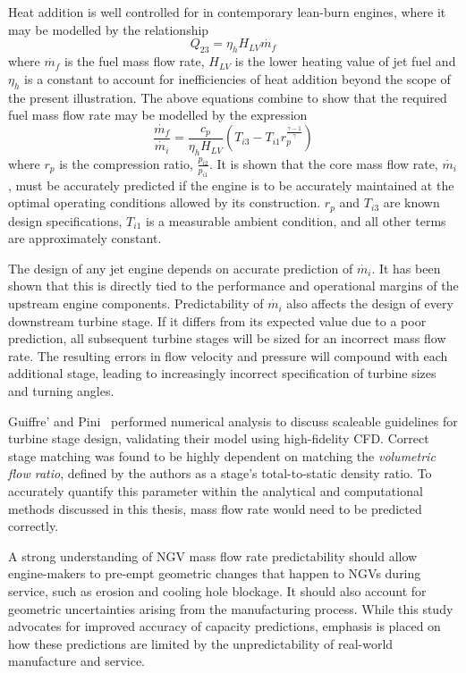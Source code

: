 \documentclass[a4paper, 11pt, oneside]{report}
\begin{document}
Heat addition is well controlled for in contemporary lean-burn engines, where it may be modelled by the relationship
\begin{equation}
	Q_{23} = 
	\eta_h
	H_{LV}
	\dot{m_f}
\end{equation}
where $\dot{m_f}$ is the fuel mass flow rate, $H_{LV}$ is the lower heating value of jet fuel and $\eta_h$ is a constant to account for inefficiencies of heat addition beyond the scope of the present illustration. The above equations combine to show that the required fuel mass flow rate may be modelled by the expression
\begin{equation}
	\frac{\dot{m_f}}{\dot{m_i}}
	=
	\frac{c_p}{\eta_{h}H_{LV}}
	\left(
		T_{i3} - 
		T_{i1}
		r_p
		^
		\frac{\gamma-1}{\gamma}
	\right)
\end{equation}
where $r_p$ is the compression ratio, $\frac{p_{i2}}{p_{i1}}$. It is shown that the core mass flow rate, $\dot{m_i}$, must be accurately predicted if the engine is to be accurately maintained at the optimal operating conditions allowed by its construction. $r_p$ and $T_{i3}$ are known design specifications, $T_{i1}$ is a measurable ambient condition, and all other terms are approximately constant. 

The design of any jet engine depends on accurate prediction of $\dot{m_i}$. It has been shown that this is directly tied to the performance and operational margins of the upstream engine components. Predictability of $\dot{m_i}$ also affects the design of every downstream turbine stage. If it differs from its expected value due to a poor prediction, all subsequent turbine stages will be sized for an incorrect mass flow rate. The resulting errors in flow velocity and pressure will compound with each additional stage, leading to increasingly incorrect specification of turbine sizes and turning angles.

Guiffre' and Pini~\cite{guiffre_design_guidelines} performed numerical analysis to discuss scaleable guidelines for turbine stage design, validating their model using high-fidelity CFD.  Correct stage matching was found to be highly dependent on matching the \textit{volumetric flow ratio}, defined by the authors as a stage's total-to-static density ratio. To accurately quantify this parameter within the analytical and computational methods discussed in this thesis, mass flow rate would need to be predicted correctly.

A strong understanding of NGV mass flow rate predictability should allow engine-makers to pre-empt geometric changes that happen to NGVs during service, such as erosion and cooling hole blockage. It should also account for geometric uncertainties arising from the manufacturing process. While this study advocates for improved accuracy of capacity predictions, emphasis is placed on how these predictions are limited by the unpredictability of real-world manufacture and service.
\end{document}
